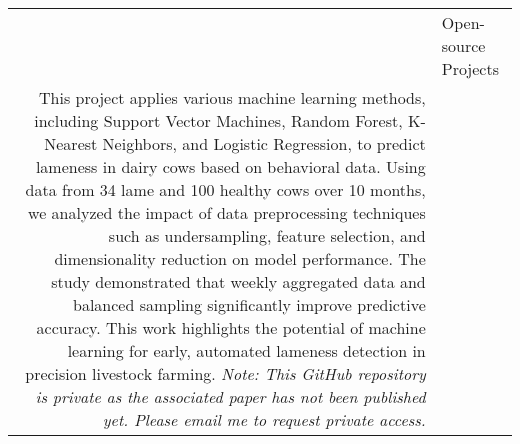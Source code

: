 \documentclass[letterpaper, 11pt]{article}
\newcommand{\headingfont}{\Large\color{OliveGreen}}
\newenvironment{SectionTable}[1]{
	\renewcommand*{\arraystretch}{1.7}
	\setlength{\tabcolsep}{10pt}
	\begin{longtable}{Rp{5.2in}} & #1 \\}
{\end{longtable}\vspace{-.3cm}}
\begin{document}
\begin{SectionTable}{\headingfont Open-source Projects}
This project applies various machine learning methods, including Support Vector Machines, Random Forest, K-Nearest Neighbors, and Logistic Regression, to predict lameness in dairy cows based on behavioral data. Using data from 34 lame and 100 healthy cows over 10 months, we analyzed the impact of data preprocessing techniques such as undersampling, feature selection, and dimensionality reduction on model performance. The study demonstrated that weekly aggregated data and balanced sampling significantly improve predictive accuracy. This work highlights the potential of machine learning for early, automated lameness detection in precision livestock farming. \newline
\textit{Note: This GitHub repository is private as the associated paper has not been published yet. Please email me to request private access.} \\
\end{SectionTable}

\end{document}
